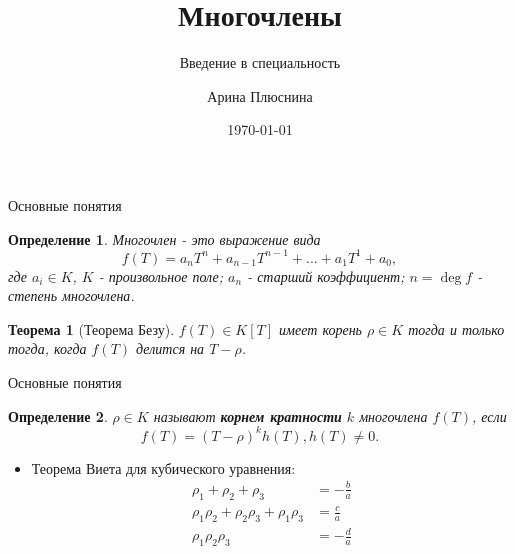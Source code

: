 \documentclass{beamer}
\title{Многочлены}
\subtitle{Введение в специальность}
\author{Арина Плюснина}
\institute{БФУ им. И. Канта}
\date{\today}
\begin{document}
	\begin{frame}
		\titlepage
	\end{frame}
	\begin{frame}{Основные понятия}
		\newtheorem{opr}{Определение}
		\newtheorem{theorm}{Теорема}
		\begin{opr}Многочлен - это выражение вида
			\[f(T)=a_{n} T^n+a_{n-1}T^{n-1}+...+a_1T^1+a_0,\]
			где $a_i\in K$, $K$ - произвольное поле;
			$a_n$ -  старший коэффициент;
			$n=\deg f$ - степень многочлена.
		\end{opr}
			\begin{theorm}[Теорема Безу] $f(T)\in K[T]$ имеет корень $\rho\in K$ тогда и только тогда, когда $f(T)$ делится на $T-\rho$.
			\end{theorm}
	\end{frame}
	
	\begin{frame}{Основные понятия}
		
		\begin{opr}
			$\rho\in K$ называют \textbf{корнем кратности} $k$ многочлена $f(T)$, если 
				\[f(T)=(T-\rho)^kh(T), h(T)\ne0.\]
		\end{opr}
		\begin{itemize}
			\item Теорема Виета для кубического уравнения:
			\begin{equation*}
			\begin{split}
			\rho_1+\rho_2+\rho_3&=-\frac{b}{a}
			\\\rho_1\rho_2+\rho_2\rho_3+\rho_1\rho_3&=\frac{c}{a}
			\\\rho_1\rho_2\rho_3&=-\frac{d}{a}
			\end{split}
			\end{equation*}
		\end{itemize}
	\end{frame}
\end{document}
